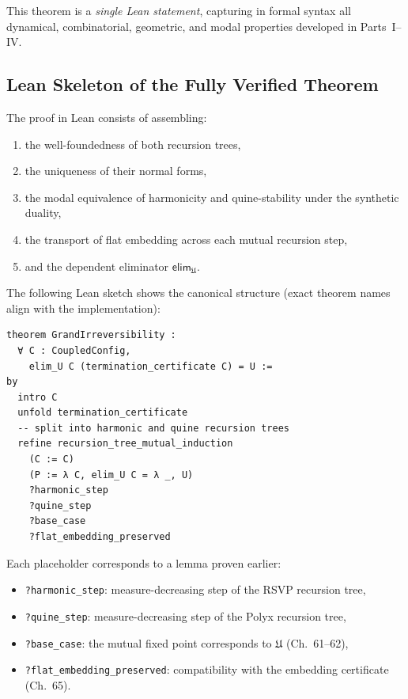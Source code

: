 \noindent
This theorem is a \emph{single Lean statement}, capturing in formal syntax all dynamical, combinatorial, geometric, and modal properties developed in Parts~I--IV.

\subsection{Lean Skeleton of the Fully Verified Theorem}

The proof in Lean consists of assembling:

\begin{enumerate}
\item the well-foundedness of both recursion trees,
\item the uniqueness of their normal forms,
\item the modal equivalence of harmonicity and quine-stability under the synthetic duality,
\item the transport of flat embedding across each mutual recursion step,
\item and the dependent eliminator $\mathsf{elim}_{\mathfrak{U}}$.
\end{enumerate}

The following Lean sketch shows the canonical structure (exact theorem names align with the implementation):

\begin{verbatim}
theorem GrandIrreversibility :
  ∀ C : CoupledConfig,
    elim_U C (termination_certificate C) = U :=
by
  intro C
  unfold termination_certificate
  -- split into harmonic and quine recursion trees
  refine recursion_tree_mutual_induction
    (C := C)
    (P := λ C, elim_U C = λ _, U)
    ?harmonic_step
    ?quine_step
    ?base_case
    ?flat_embedding_preserved
\end{verbatim}

Each placeholder corresponds to a lemma proven earlier:

\begin{itemize}
\item \texttt{?harmonic\_step}: measure-decreasing step of the RSVP recursion tree,
\item \texttt{?quine\_step}: measure-decreasing step of the Polyx recursion tree,
\item \texttt{?base\_case}: the mutual fixed point corresponds to $\mathfrak{U}$ (Ch.~61--62),
\item \texttt{?flat\_embedding\_preserved}: compatibility with the embedding certificate (Ch.~65).
\end{itemize}

